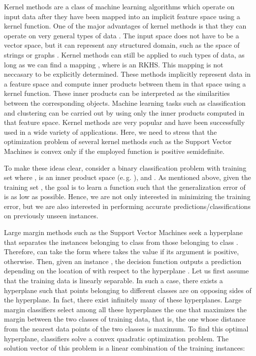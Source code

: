 \documentclass[twoside,11pt]{article}
\newcommand{\eg}{e.\,g. }
\begin{document}
Kernel methods are a class of machine learning algorithms which operate on input data after they have been mapped into an implicit feature space using a kernel function.
One of the major advantages of kernel methods is that they can operate on very general types of data \cite{scholkopf2002learning}.
The input space  does not have to be a vector space, but it can represent any structured domain, such as the space of strings or graphs \cite{gartner2003survey}.
Kernel methods can still be applied to such types of data, as long as we can find a mapping , where  is an RKHS.
This mapping is not neccasary to be explicitly determined. 
These methods implicitly represent data in a feature space and compute inner products between them in that space using a kernel function.
These inner products can be interpreted as the similarities between the corresponding objects.
Machine learning tasks such as classification and clustering can be carried out by using only the inner products computed in that feature space.
Kernel methods are very popular and have been successfully used in a wide variety of applications.
Here, we need to stress that the optimization problem of several kernel methods such as the Support Vector Machines is convex only if the employed function is positive semidefinite.

To make these ideas clear, consider a binary classification problem with training set  where ,  is an inner product space (\eg ), and .
As mentioned above, given the training set , the goal is to learn a function  such that the generalization error of  is as low as possible.
Hence, we are not only interested in minimizing the training error, but we are also interested in performing 
accurate predictions/classifications on previously unseen instances.

Large margin methods such as the Support Vector Machines seek a hyperplane that separates the instances belonging to class  from those belonging to class .
Therefore,  can take the form  where  takes the value  if its argument is positive,  otherwise.
Then, given an instance , the decision function  outputs a prediction depending on the location of  with respect to the hyperplane .
Let us first assume that the training data is linearly separable.
In such a case, there exists a hyperplane such that points belonging to different classes are on opposing sides of the hyperplane.
In fact, there exist infinitely many of these hyperplanes.
Large margin classifiers select among all these hyperplanes the one that maximizes the margin between the two classes of training data, that is, the one whose distance from the nearest data points of the two classes is maximum.
To find this optimal hyperplane, classifiers solve a convex quadratic optimization problem.
The solution vector  of this problem is a linear combination of the training instances:
\end{document}
